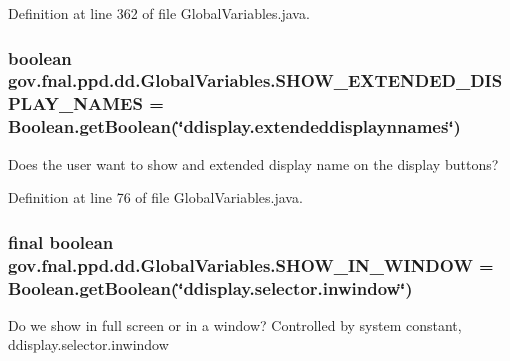 Definition at line 362 of file Global\-Variables.\-java.

\hypertarget{classgov_1_1fnal_1_1ppd_1_1dd_1_1GlobalVariables_a24c624ba470a455c7ed0c43d72a9f417}{
\subsubsection[{S\-H\-O\-W\-\_\-\-E\-X\-T\-E\-N\-D\-E\-D\-\_\-\-D\-I\-S\-P\-L\-A\-Y\-\_\-\-N\-A\-M\-E\-S}]{\setlength{\rightskip}{0pt plus 5cm}boolean gov.\-fnal.\-ppd.\-dd.\-Global\-Variables.\-S\-H\-O\-W\-\_\-\-E\-X\-T\-E\-N\-D\-E\-D\-\_\-\-D\-I\-S\-P\-L\-A\-Y\-\_\-\-N\-A\-M\-E\-S = Boolean.\-get\-Boolean(\char`\"{}ddisplay.\-extendeddisplaynnames\char`\"{})\hspace{0.3cm}{\ttfamily [static]}}}\label{classgov_1_1fnal_1_1ppd_1_1dd_1_1GlobalVariables_a24c624ba470a455c7ed0c43d72a9f417}
Does the user want to show and extended display name on the display buttons? 

Definition at line 76 of file Global\-Variables.\-java.

\hypertarget{classgov_1_1fnal_1_1ppd_1_1dd_1_1GlobalVariables_af0e7b37c8bf6495b999b93ed0f4f1c76}{
\subsubsection[{S\-H\-O\-W\-\_\-\-I\-N\-\_\-\-W\-I\-N\-D\-O\-W}]{\setlength{\rightskip}{0pt plus 5cm}final boolean gov.\-fnal.\-ppd.\-dd.\-Global\-Variables.\-S\-H\-O\-W\-\_\-\-I\-N\-\_\-\-W\-I\-N\-D\-O\-W = Boolean.\-get\-Boolean(\char`\"{}ddisplay.\-selector.\-inwindow\char`\"{})\hspace{0.3cm}{\ttfamily [static]}}}\label{classgov_1_1fnal_1_1ppd_1_1dd_1_1GlobalVariables_af0e7b37c8bf6495b999b93ed0f4f1c76}
Do we show in full screen or in a window? Controlled by system constant, ddisplay.\-selector.\-inwindow 

